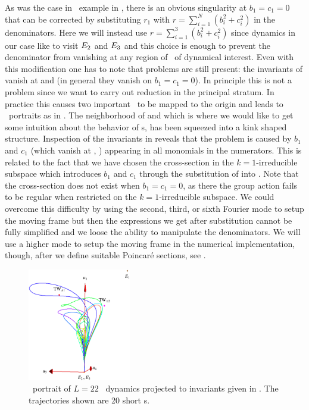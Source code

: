 As was the case in \CLe\ example in ,
there is an obvious singularity at $b_1=c_1=0$ that can be corrected by substituting
$r_1$ with
$r=\sum_{i=1}^N (b_i^2+c_i^2)$ in the denominators.
Here we will instead use $r=\sum_{i=1}^3 (b_i^2+c_i^2)$
since
dynamics in our case like to visit $E_{2}$ and $E_{3}$
and this choice is enough to prevent the denominator from
vanishing at any region of \statesp\ of dynamical interest.
Even with this modification one has to note that problems
are still present: the invariants of
 vanish at  and  (in general
they vanish on $b_1=c_1=0$).
In principle
this is not a problem since we want to carry out reduction in
the principal stratum. In practice this causes two important
\eqva\ to be mapped to the origin and leads to \statesp\
portraits as in . The neighborhood of
 and  which is where we would like to get some
intuition about the behavior of \rpo s, has been squeezed into
a kink shaped structure.
Inspection of the invariants in  reveals
that the problem is caused by $b_1$ and $c_1$ (which vanish
at , ) appearing in all monomials in the
numerators. This is related to the fact that we have chosen
the cross-section in the $k=1$-irreducible subspace which
introduces $b_1$ and $c_1$ through the substitution of
 into . Note that the
cross-section does not exist when $b_1=c_1=0$, as there the
group action fails to be regular when restricted on the
$k=1$-irreducible subspace.
We could overcome this
difficulty by using the second, third, or sixth Fourier mode
to setup the moving frame but then the expressions we get
after substitution cannot be fully simplified and we loose
the ability to manipulate the denominators. We will use a
higher mode to setup the moving frame in the numerical
implementation, though, after we define suitable Poincar\'e
sections, see .

\begin{figure}[t]
\begin{center}
\includegraphics[width=0.4\textwidth, clip=true]{../figs/ksSO2inv145eqbTo0}
\end{center}
\caption[\KS\  reduced \statesp, modified invariants]
   {\Statesp\ portrait of $L=22$ \KS\ dynamics projected to
   invariants given in . The trajectories
   shown are 20 short \rpo s. }
\label{fig:ksSO2eqbTo0}
\end{figure}

